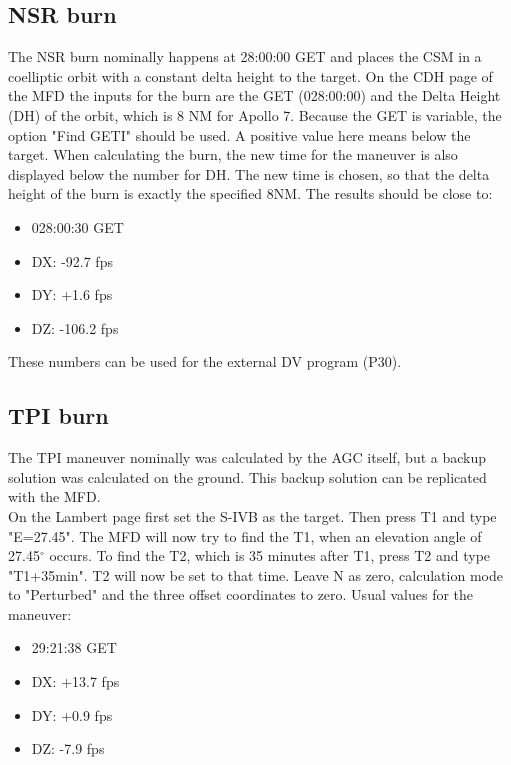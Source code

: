 \documentclass[11pt]{article} %
\begin{document}
\subsection{NSR burn}

The NSR burn nominally happens at 28:00:00 GET and places the CSM in a coelliptic orbit with a constant delta height to the target. On the CDH page of the MFD the inputs for the burn are the GET (028:00:00) and the Delta Height (DH) of the orbit, which is 8 NM for Apollo 7. Because the GET is variable, the option "Find GETI" should be used. A positive value here means below the target. When calculating the burn, the new time for the maneuver is also displayed below the number for DH. The new time is chosen, so that the delta height of the burn is exactly the specified 8NM. The results should be close to:

\begin{itemize}
	\item{028:00:30 GET}
	\item{DX: -92.7 fps}
	\item{DY: +1.6 fps}
	\item{DZ: -106.2 fps}
\end{itemize}

These numbers can be used for the external DV program (P30).

\subsection{TPI burn}

The TPI maneuver nominally was calculated by the AGC itself, but a backup solution was calculated on the ground. This backup solution can be replicated with the MFD.\\
On the Lambert page first set the S-IVB as the target. Then press T1 and type "E=27.45". The MFD will now try to find the T1, when an elevation angle of 27.45$^{\circ}$ occurs. To find the T2, which is 35 minutes after T1, press T2 and type "T1+35min". T2 will now be set to that time. Leave N as zero, calculation mode to "Perturbed" and the three offset coordinates to zero. Usual values for the maneuver:

\begin{itemize}
	\item{29:21:38 GET}
	\item{DX: +13.7 fps}
	\item{DY: +0.9 fps}
	\item{DZ: -7.9 fps}
\end{itemize}
	
\end{document}
